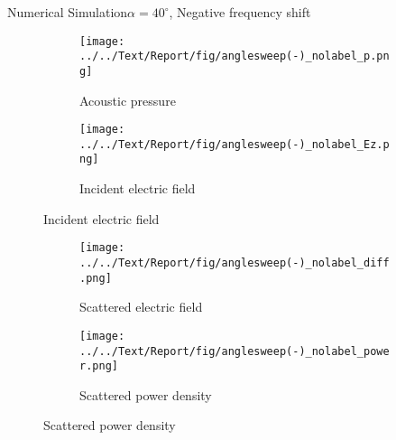 \documentclass[11pt, final]{beamer}
\begin{document}
	\begin{frame}{Numerical Simulation}{$\alpha = 40^\circ$, Negative frequency shift}
		\begin{figure}
			\centering
			\begin{subfigure}[t]{0.5\textheight}
				\vspace{-1cm}
				\caption*{\hspace{0.5cm}Acoustic pressure}
				\vspace{-0.2cm}
				\texttt{[image: ../../Text/Report/fig/anglesweep(-)\_nolabel\_p.png]}
			\end{subfigure}
			\begin{subfigure}[t]{0.5\textheight}
				\vspace{-1cm}
				\caption*{\hspace{0.5cm}Incident electric field}
				\vspace{-0.2cm}
				\texttt{[image: ../../Text/Report/fig/anglesweep(-)\_nolabel\_Ez.png]}
			\end{subfigure}
		\end{figure}
		
		\begin{figure}
			\centering
			\vspace{-0.4cm}
			\begin{subfigure}[t]{0.5\textheight}
				\texttt{[image: ../../Text/Report/fig/anglesweep(-)\_nolabel\_diff.png]}
				\vspace{-0.1cm}
				\caption*{\hspace{0.5cm}Scattered electric field}
			\end{subfigure}
			\begin{subfigure}[t]{0.5\textheight}
				\texttt{[image: ../../Text/Report/fig/anglesweep(-)\_nolabel\_power.png]}
				\vspace{-0.1cm}
				\caption*{\hspace{0.5cm}Scattered power density}
			\end{subfigure}
		\end{figure}
	\end{frame}
	
\end{document}
